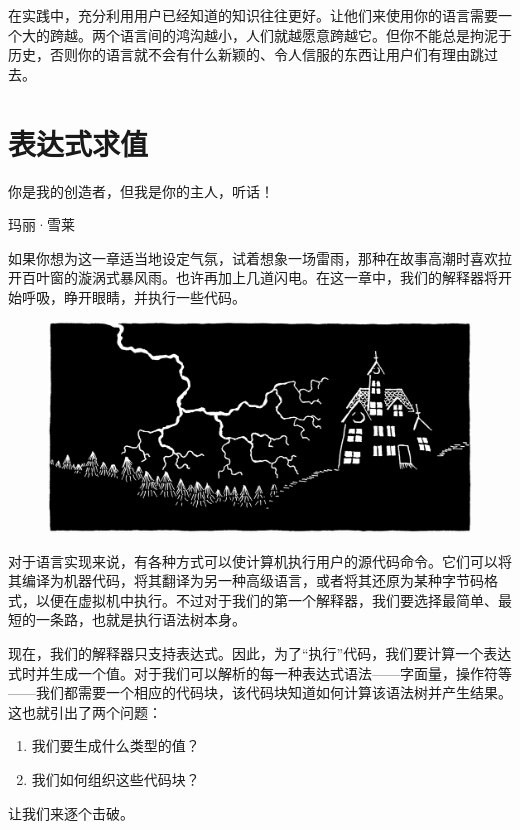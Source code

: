\documentclass[cn,11pt,chinese]{elegantbook}
\begin{document}
在实践中，充分利用用户已经知道的知识往往更好。让他们来使用你的语言需要一个大的跨越。两个语言间的鸿沟越小，人们就越愿意跨越它。但你不能总是拘泥于历史，否则你的语言就不会有什么新颖的、令人信服的东西让用户们有理由跳过去。

\chapter{表达式求值}

\epigraph{你是我的创造者，但我是你的主人，听话！}{玛丽·雪莱}

如果你想为这一章适当地设定气氛，试着想象一场雷雨，那种在故事高潮时喜欢拉开百叶窗的漩涡式暴风雨。也许再加上几道闪电。在这一章中，我们的解释器将开始呼吸，睁开眼睛，并执行一些代码。

\begin{figure}[htbp]
  \centering
  \includegraphics[width=\textwidth]{image/evaluating-expressions/lightning.png}
\end{figure}

对于语言实现来说，有各种方式可以使计算机执行用户的源代码命令。它们可以将其编译为机器代码，将其翻译为另一种高级语言，或者将其还原为某种字节码格式，以便在虚拟机中执行。不过对于我们的第一个解释器，我们要选择最简单、最短的一条路，也就是执行语法树本身。

现在，我们的解释器只支持表达式。因此，为了“执行”代码，我们要计算一个表达式时并生成一个值。对于我们可以解析的每一种表达式语法——字面量，操作符等——我们都需要一个相应的代码块，该代码块知道如何计算该语法树并产生结果。这也就引出了两个问题：

\begin{enumerate}
  \item 我们要生成什么类型的值？
  \item 我们如何组织这些代码块？
\end{enumerate}

让我们来逐个击破。
\end{document}

